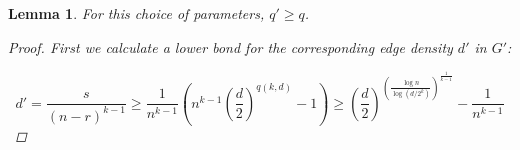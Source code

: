 \documentclass[12pt]{article}
\newtheorem{lemma}[thm]{Lemma}
\begin{document}
    \begin{lemma} \label{lemma:q_prime}
        For this choice of parameters, $q' \geq q$.

        \begin{proof}
            First we calculate a lower bond for the corresponding edge density $d'$ in $G'$:

            \begin{equation*}
                d' = \frac{s}{(n-r)^{k-1}} \geq \frac{1}{n^{k-1}} \left(  n^{k-1} \left( \frac{d}{2} \right)^{q(k, d)} - 1\right)
                \geq \left( \frac{d}{2} \right)^{\left(  \frac{\log n}{\log (d/2^k)} \right)^{\frac{1}{k-1}}} - \frac{1}{n^{k-1}}
            \end{equation*}


        \end{proof}

    \end{lemma}








    
    
\end{document}

